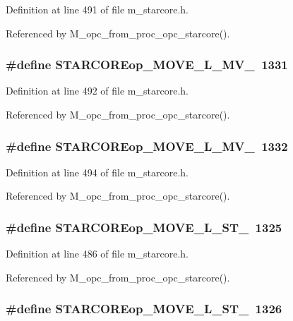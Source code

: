 Definition at line 491 of file m\_\-starcore.h.

Referenced by M\_\-opc\_\-from\_\-proc\_\-opc\_\-starcore().
\subsubsection{\setlength{\rightskip}{0pt plus 5cm}\#define STARCOREop\_\-MOVE\_\-L\_\-MV\_~1331}\label{m__starcore_8h_ba20607ebfd0e741b6da3bd9d30c39ce}




Definition at line 492 of file m\_\-starcore.h.

Referenced by M\_\-opc\_\-from\_\-proc\_\-opc\_\-starcore().
\subsubsection{\setlength{\rightskip}{0pt plus 5cm}\#define STARCOREop\_\-MOVE\_\-L\_\-MV\_~1332}\label{m__starcore_8h_0627557601b421fc873c936bb2dc47cf}




Definition at line 494 of file m\_\-starcore.h.

Referenced by M\_\-opc\_\-from\_\-proc\_\-opc\_\-starcore().
\subsubsection{\setlength{\rightskip}{0pt plus 5cm}\#define STARCOREop\_\-MOVE\_\-L\_\-ST\_~1325}\label{m__starcore_8h_79881eed582d8c4af652b8b413507966}




Definition at line 486 of file m\_\-starcore.h.

Referenced by M\_\-opc\_\-from\_\-proc\_\-opc\_\-starcore().
\subsubsection{\setlength{\rightskip}{0pt plus 5cm}\#define STARCOREop\_\-MOVE\_\-L\_\-ST\_~1326}\label{m__starcore_8h_f96743c13efc9ef34f3a29d8e02257c5}




